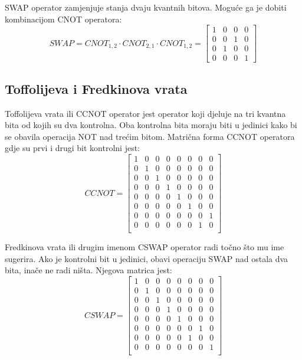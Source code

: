 SWAP operator zamjenjuje stanja dvaju kvantnih bitova. Moguće ga je dobiti kombinacijom CNOT operatora:
\[
\textit{SWAP} = CNOT_{1,2}\cdot CNOT_{2,1}\cdot CNOT_{1,2} = \begin{bmatrix}
1 & 0 & 0 & 0 \\ 0 & 0 & 1 & 0 \\ 0 & 1 & 0 & 0 \\ 0 & 0 & 0 & 1
\end{bmatrix}
\]

\subsection{Toffolijeva i Fredkinova vrata}

Toffolijeva vrata ili CCNOT operator jest operator koji djeluje na tri kvantna bita od kojih su dva kontrolna. Oba kontrolna bita moraju biti u jedinici kako bi se obavila operacija NOT nad trećim bitom. Matrična forma CCNOT operatora gdje su prvi i drugi bit kontrolni jest:
\[
\textit{CCNOT}= \begin{bmatrix}
1 & 0 & 0 & 0 & 0 & 0 & 0 & 0 \\
0 & 1 & 0 & 0 & 0 & 0 & 0 & 0 \\
0 & 0 & 1 & 0 & 0 & 0 & 0 & 0 \\
0 & 0 & 0 & 1 & 0 & 0 & 0 & 0 \\
0 & 0 & 0 & 0 & 1 & 0 & 0 & 0 \\
0 & 0 & 0 & 0 & 0 & 1 & 0 & 0 \\
0 & 0 & 0 & 0 & 0 & 0 & 0 & 1 \\
0 & 0 & 0 & 0 & 0 & 0 & 1 & 0 \\
\end{bmatrix}
\]

Fredkinova vrata ili drugim imenom CSWAP operator radi točno što mu ime sugerira. Ako je kontrolni bit u jedinici, obavi operaciju SWAP nad ostala dva bita, inače ne radi ništa. Njegova matrica jest:
\[
\textit{CSWAP} = \begin{bmatrix}
1 & 0 & 0 & 0 & 0 & 0 & 0 & 0 \\
0 & 1 & 0 & 0 & 0 & 0 & 0 & 0 \\
0 & 0 & 1 & 0 & 0 & 0 & 0 & 0 \\
0 & 0 & 0 & 1 & 0 & 0 & 0 & 0 \\
0 & 0 & 0 & 0 & 1 & 0 & 0 & 0 \\
0 & 0 & 0 & 0 & 0 & 0 & 1 & 0 \\
0 & 0 & 0 & 0 & 0 & 1 & 0 & 0 \\
0 & 0 & 0 & 0 & 0 & 0 & 0 & 1 \\
\end{bmatrix}
\]

